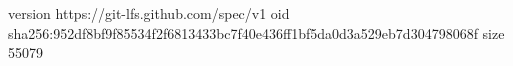 version https://git-lfs.github.com/spec/v1
oid sha256:952df8bf9f85534f2f6813433bc7f40e436ff1bf5da0d3a529eb7d304798068f
size 55079
